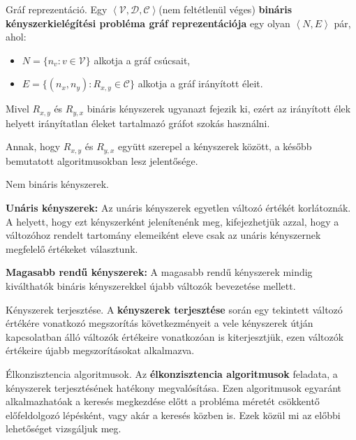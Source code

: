 \begin{definicio}
    Gráf reprezentáció.
    Egy $\left<\mathcal{V}, \mathcal{D}, \mathcal{C} \right>$(nem feltétlenül
    véges) {\bf bináris kényszerkielégítési probléma gráf reprezentációja}
    egy olyan $\left<N, E \right>$ pár, ahol:
    \begin{itemize}
        \item $N = \{n_v : v \in \mathcal{V}\}$ alkotja a gráf csúcsait,
        \item $E = \{
                (n_x, n_y) : R_{x,y} \in \mathcal{C}
            \}$ alkotja a gráf irányított éleit.
    \end{itemize}

    \begin{megjegyzes}
        Mivel $R_{x,y}$ és  $R_{y,x}$ bináris kényszerek ugyanazt fejezik ki,
        ezért az irányított élek helyett irányítatlan éleket tartalmazó gráfot
        szokás használni.

        Annak, hogy $R_{x,y}$ és  $R_{y,x}$ együtt szerepel a kényszerek között,
        a később bemutatott algoritmusokban lesz jelentősége.
    \end{megjegyzes}
\end{definicio}

\begin{definicio}
    Nem bináris kényszerek.

    {\bf Unáris kényszerek:} Az unáris kényszerek egyetlen változó értékét
    korlátoznák. A helyett, hogy ezt kényszerként jelenítenénk meg,
    kifejezhetjük azzal, hogy a változóhoz rendelt tartomány elemeiként eleve
    csak az unáris kényszernek megfelelő értékeket választunk.

    {\bf Magasabb rendű kényszerek:}  A magasabb rendű kényszerek mindig
    kiválthatók bináris kényszerekkel újabb változók bevezetése mellett.
\end{definicio}

\begin{definicio}
    Kényszerek terjesztése.
    A \textbf{kényszerek terjesztése} során egy tekintett változó értékére
    vonatkozó megszorítás következményeit a vele kényszerek útján kapcsolatban
    álló változók értékeire vonatkozóan is kiterjesztjük, ezen változók
    értékeire újabb megszorításokat alkalmazva.
\end{definicio}

\begin{definicio}
    Élkonzisztencia algoritmusok.
    Az \textbf{élkonzisztencia algoritmusok} feladata, a kényszerek
    terjesztésének hatékony megvalósítása. Ezen algoritmusok egyaránt
    alkalmazhatóak a keresés megkezdése előtt a probléma méretét csökkentő
    előfeldolgozó lépésként, vagy akár a keresés közben is. Ezek közül mi az
    előbbi lehetőséget vizsgáljuk meg.
\end{definicio}

